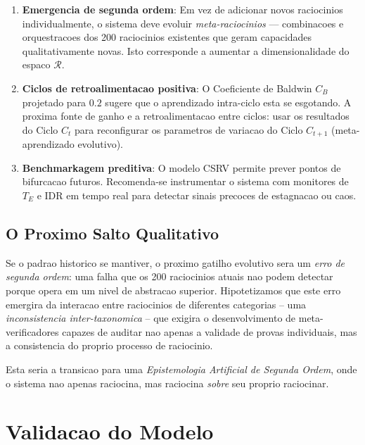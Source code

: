 \documentclass[5p]{elsarticle}
\begin{document}
\begin{enumerate}[label=Direcao \arabic*:]

  \item \textbf{Emergencia de segunda ordem}: Em vez de adicionar novos
    raciocinios individualmente, o sistema deve evoluir \textit{meta-raciocinios}
    --- combinacoes e orquestracoes dos 200 raciocinios existentes que geram
    capacidades qualitativamente novas. Isto corresponde a aumentar a
    dimensionalidade do espaco $\mathcal{R}$.

  \item \textbf{Ciclos de retroalimentacao positiva}: O Coeficiente de Baldwin
    $C_B$ projetado para $0.2$ sugere que o aprendizado intra-ciclo esta
    se esgotando. A proxima fonte de ganho e a retroalimentacao entre ciclos:
    usar os resultados do Ciclo $C_{t}$ para reconfigurar os parametros de
    variacao do Ciclo $C_{t+1}$ (meta-aprendizado evolutivo).

  \item \textbf{Benchmarkagem preditiva}: O modelo CSRV permite prever pontos
    de bifurcacao futuros. Recomenda-se instrumentar o sistema com monitores
    de $T_E$ e IDR em tempo real para detectar sinais precoces de estagnacao
    ou caos.
\end{enumerate}

\subsection{O Proximo Salto Qualitativo}

Se o padrao historico se mantiver, o proximo gatilho evolutivo sera um
\textit{erro de segunda ordem}: uma falha que os 200 raciocinios atuais
nao podem detectar porque opera em um nivel de abstracao superior.
Hipotetizamos que este erro emergira da interacao entre raciocinios de
diferentes categorias -- uma \textit{inconsistencia inter-taxonomica} --
que exigira o desenvolvimento de meta-verificadores capazes de auditar
nao apenas a validade de provas individuais, mas a consistencia do proprio
processo de raciocinio.

Esta seria a transicao para uma \textit{Epistemologia Artificial de
Segunda Ordem}, onde o sistema nao apenas raciocina, mas raciocina
\textit{sobre} seu proprio raciocinar.

\section{Validacao do Modelo}
\end{document}

